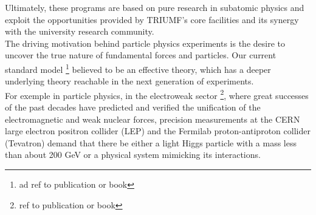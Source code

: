 \documentclass[a4paper, 11pt]{report}%
\begin{document}
  Ultimately, these programs are based on pure research in subatomic physics 
  and exploit the opportunities provided by TRIUMF’s core facilities and its synergy with the university research community.\\
  The driving motivation behind particle physics experiments is the desire to uncover the true nature of fundamental forces and particles. 
  Our current standard model \footnote{ad ref to publication or book} believed to be an effective theory, which has a deeper underlying theory reachable in the next generation 
  of experiments. 
  \\
  For exemple in particle physics, in the electroweak sector \footnote{ref to publication or book}, where great successes of the past decades have predicted and verified the unification of the 
  electromagnetic and weak nuclear forces, precision measurements at the CERN large electron positron collider (LEP) and the Fermilab 
  proton-antiproton collider (Tevatron) demand that there be either a light Higgs particle with a mass less than about 200 GeV or a 
  physical system mimicking its interactions. 
  \\
  
    


  
\end{document}
